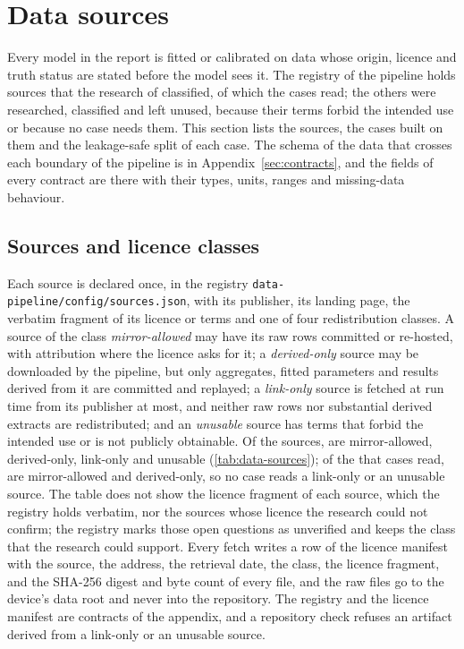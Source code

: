 \section{Data sources}
\label{sec:data}

Every model in the report is fitted or calibrated on data whose origin, licence and truth status are stated before the model sees it. The registry of the pipeline holds \rsSources{} sources
that the research of \rsSourcesResearched{} classified, \rsSourcesUsed{} of which the cases read; the others were researched, classified and left unused, because their terms
forbid the intended use or because no case needs them. This section lists the sources, the cases built on them and the leakage-safe split of each case. The schema of the
data that crosses each boundary of the pipeline is in Appendix~\ref{sec:contracts}, and the fields of every contract are there with their types, units, ranges and missing-data behaviour.

\subsection{Sources and licence classes}
\label{sec:data-sources}

Each source is declared once, in the registry \texttt{data-pipeline/config/sources.json}, with its publisher, its landing page, the verbatim fragment of its licence or terms and one of four
redistribution classes. A source of the class \emph{mirror-allowed} may have its raw rows committed or re-hosted, with attribution where the licence asks for it; a \emph{derived-only} source may be
downloaded by the pipeline, but only aggregates, fitted parameters and results derived from it are committed and replayed; a \emph{link-only} source is fetched at run time from its publisher
at most, and neither raw rows nor substantial derived extracts are redistributed; and an \emph{unusable} source has terms that forbid the intended use or is not publicly obtainable.
Of the \rsSources{} sources, \rsSourcesMirror{} are mirror-allowed, \rsSourcesDerived{} derived-only, \rsSourcesLink{} link-only and \rsSourcesUnusable{} unusable (\cref{tab:data-sources}); of the
\rsSourcesUsed{} that cases read, \rsSourcesUsedMirror{} are mirror-allowed and \rsSourcesUsedDerived{} derived-only, so no case reads a link-only or an unusable source. The table does not show
the licence fragment of each source, which the registry holds verbatim, nor the sources whose licence the research could not confirm; the registry marks those open questions as unverified and
keeps the class that the research could support. Every fetch writes a row of the licence manifest with the source, the address, the retrieval date, the class, the licence fragment, and the SHA-256
digest and byte count of every file, and the raw files go to the device's data root and never into the repository. The registry and the licence manifest are contracts of the appendix, and a repository check
refuses an artifact derived from a link-only or an unusable source.

